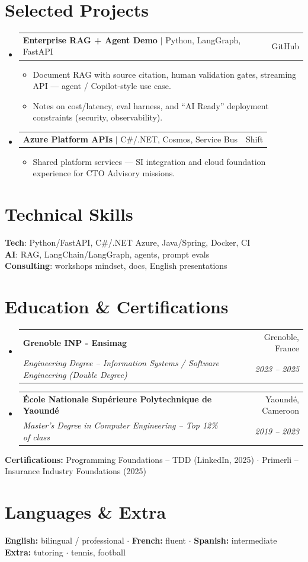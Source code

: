\documentclass[letterpaper,10.5pt]{article}
\makeatletter
\newcommand{\resumeItem}[1]{\item\small{#1 \vspace{-1.5pt}}}
\newcommand{\resumeSubheading}[4]{\vspace{-1pt}\item\begin{tabular*}{0.97\textwidth}[t]{l@{\extracolsep{\fill}}r}\textbf{#1} & #2 \\\textit{\small#3} & \textit{\small #4} \\\end{tabular*}\vspace{-5pt}}
\newcommand{\resumeProjectHeading}[2]{\item\begin{tabular*}{0.97\textwidth}{l@{\extracolsep{\fill}}r}\small#1 & #2 \\\end{tabular*}\vspace{-5pt}}
\newcommand{\resumeSubHeadingListStart}{\begin{itemize}[leftmargin=0.15in, label={}]}
\newcommand{\resumeSubHeadingListEnd}{\end{itemize}}
\newcommand{\resumeItemListStart}{\begin{itemize}[leftmargin=0.18in]}
\newcommand{\resumeItemListEnd}{\end{itemize}\vspace{-3pt}}
\makeatother
\begin{document}
\section{Selected Projects}
\resumeSubHeadingListStart
  \resumeProjectHeading{\textbf{Enterprise RAG + Agent Demo} $|$ Python, LangGraph, FastAPI}{GitHub}
    \resumeItemListStart
      \resumeItem{Document RAG with source citation, human validation gates, streaming API --- agent / Copilot-style use case.}
      \resumeItem{Notes on cost/latency, eval harness, and ``AI Ready'' deployment constraints (security, observability).}
    \resumeItemListEnd
  \resumeProjectHeading{\textbf{Azure Platform APIs} $|$ C\#/.NET, Cosmos, Service Bus}{Shift}
    \resumeItemListStart
      \resumeItem{Shared platform services --- SI integration and cloud foundation experience for CTO Advisory missions.}
    \resumeItemListEnd
\resumeSubHeadingListEnd
\section{Technical Skills}
\begin{itemize}[leftmargin=0.15in, label={}]\small{\item{\textbf{Tech}: Python/FastAPI, C\#/.NET Azure, Java/Spring, Docker, CI \\ \textbf{AI}: RAG, LangChain/LangGraph, agents, prompt evals \\ \textbf{Consulting}: workshops mindset, docs, English presentations}}\end{itemize}
\section{Education \& Certifications}
\resumeSubHeadingListStart
  \resumeSubheading{Grenoble INP - Ensimag}{Grenoble, France}{Engineering Degree -- Information Systems / Software Engineering (Double Degree)}{2023 -- 2025}
  \resumeSubheading{\'Ecole Nationale Sup\'erieure Polytechnique de Yaound\'e}{Yaound\'e, Cameroon}{Master's Degree in Computer Engineering -- Top 12\% of class}{2019 -- 2023}
\resumeSubHeadingListEnd
\small{\textbf{Certifications:} Programming Foundations -- TDD (LinkedIn, 2025) $\cdot$ Primerli -- Insurance Industry Foundations (2025)}
\section{Languages \& Extra}
\small{\textbf{English:} bilingual / professional $\cdot$ \textbf{French:} fluent $\cdot$ \textbf{Spanish:} intermediate \\ \textbf{Extra:} tutoring $\cdot$ tennis, football}
\end{document}
